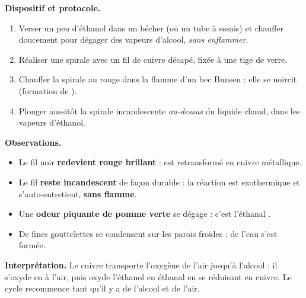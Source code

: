 \documentclass[11pt]{article}
\newcommand{\cle}[1]{{\popxbold\color{popdark}#1}}
\begin{document}
\begin{experience}
\textbf{Dispositif et protocole.}
\begin{enumerate}
\item Verser un peu d'éthanol dans un bécher (ou un tube à essais) et chauffer doucement pour dégager des vapeurs d'alcool, \emph{sans enflammer}.
\item Réaliser une spirale avec un fil de cuivre décapé, fixée à une tige de verre.
\item Chauffer la spirale au rouge dans la flamme d'un bec Bunsen : elle se noircit (formation de ).
\item Plonger aussitôt la spirale incandescente \emph{au-dessus} du liquide chaud, dans les vapeurs d'éthanol.
\end{enumerate}
\textbf{Observations.}
\begin{itemize}
\item Le fil noir \textbf{redevient rouge brillant} :  est retransformé en cuivre métallique.
\item Le fil \textbf{reste incandescent} de façon durable : la réaction est exothermique et s'auto-entretient, \textbf{sans flamme}.
\item Une \textbf{odeur piquante de pomme verte} se dégage : c'est l'\cle{éthanal} .
\item De fines gouttelettes se condensent sur les parois froides : de l'\cle{eau} s'est formée.
\end{itemize}
\textbf{Interprétation.} Le cuivre transporte l'oxygène de l'air jusqu'à l'alcool : il s'oxyde en  à l'air, puis  oxyde l'éthanol en éthanal en se réduisant en cuivre. Le cycle recommence tant qu'il y a de l'alcool et de l'air.
\end{experience}
\end{document}
